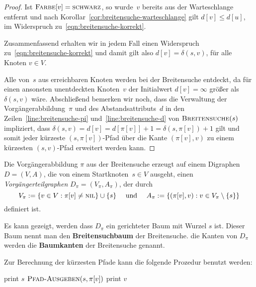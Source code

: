 \begin{proof}
Ist $\mathop{\text{\textsc{Farbe}}}[v]=\mathop{\text{\textsc{schwarz}}}$, so wurde~$v$ bereits aus der Warteschlange entfernt und nach Korollar~\ref{cor:breitensuche-warteschlange} gilt $d[v] \leq d[u]$, im Widerspruch zu~\eqref{eqn:breitensuche-korrekt}.

Zusammenfassend erhalten wir in jedem Fall einen Widerspruch zu~\eqref{eqn:breitensuche-korrekt} und damit gilt also $d[v]=\delta(s,v)$, für alle Knoten $v \in V$.

Alle von~$s$ aus erreichbaren Knoten werden bei der Breitensuche entdeckt, da für einen ansonsten unentdeckten Knoten~$v$ der Initialwert $d[v]=\infty$ größer als $\delta(s,v)$ wäre.
Abschließend bemerken wir noch, dass die Verwaltung der Vorgängerabbildung~$\pi$ und des Abstandsattributs~$d$ in den Zeilen~\ref{line:breitensuche-pi} und~\ref{line:breitensuche-d} von $\mathop{\text{\textsc{Breitensuche}}}(s)$ impliziert, dass $\delta(s,v)=d[v]=d[\pi[v]]+1=\delta(s,\pi[v])+1$ gilt und somit jeder kürzeste $(s,\pi[v])$-Pfad über die Kante $(\pi[v],v)$ zu einem kürzesten $(s,v)$-Pfad erweitert werden kann.
\end{proof}

\begin{defn} 
	Die Vorgängerabbildung $\pi$ aus der Breitensuche erzeugt auf einem Digraphen $D=(V,A)$, die von einem Startknoten~$s \in V$ ausgeht, einen \emph{Vorgängerteilgraphen} $D_\pi = (V_\pi,A_\pi)$, der durch
	\[
	V_\pi := \left\{ v \in V : \pi[v] \neq \mathop{\text{\textsc{nil}}}\right\} \cup \{s\} \quad \text{ und } \quad A_\pi := \left\{ (\pi[v],v) : v \in V_\pi \setminus \{s\}\right\}
	\]
	definiert ist.
	
	Es kann gezeigt, werden dass $D_\pi$ ein gerichteter Baum mit Wurzel $s$ ist. Dieser Baum nennt man den \textbf{Breitensuchbaum} der Breitensuche. die  Kanten von $D_\pi$ werden die \textbf{Baumkanten} der Breitensuche genannt.
\end{defn}

\begin{bem}Zur Berechnung der kürzesten Pfade kann die folgende Prozedur benutzt werden: 
	\begin{algorithm}[H]
	\caption{$\cc{Pfad-Ausgeben}(v)$}
	\begin{algorithmic}[1]
		\STATE print $s$
		\ELSE
		\STATE $\mathop{\text{\textsc{Pfad-Ausgeben}}}(s,\pi[v])$
		\STATE print $v$
		\ENDIF
	\end{algorithmic}
\end{algorithm}
\end{bem}


